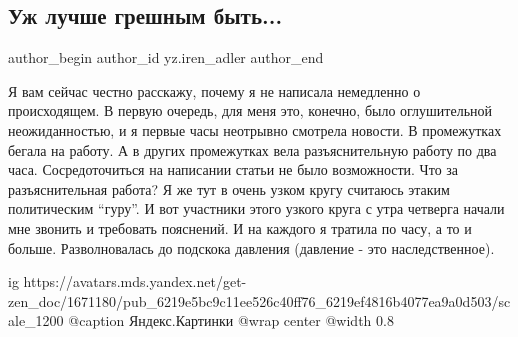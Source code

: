  
 
 
 
 
 
\subsection{Уж лучше грешным быть...}
\label{sec:27_02_2022.yz.iren_adler.1.uzh_lusche_greshnym_byt}
 
\ifcmt
 author_begin
   author_id yz.iren_adler
 author_end
\fi

Я вам сейчас честно расскажу, почему я не написала немедленно о происходящем. В
первую очередь, для меня это, конечно, было оглушительной неожиданностью, и я
первые часы неотрывно смотрела новости. В промежутках бегала на работу. А в
других промежутках вела разъяснительную работу по два часа. Сосредоточиться на
написании статьи не было возможности. Что за разъяснительная работа? Я же тут в
очень узком кругу считаюсь этаким политическим \enquote{гуру}. И вот участники
этого узкого круга с утра четверга начали мне звонить и требовать пояснений. И
на каждого я тратила по часу, а то и больше. Разволновалась до подскока
давления (давление - это наследственное).

\ifcmt
  ig https://avatars.mds.yandex.net/get-zen_doc/1671180/pub_6219e5bc9c11ee526c40ff76_6219ef4816b4077ea9a0d503/scale_1200
  @caption Яндекс.Картинки
  @wrap center
  @width 0.8
\fi

